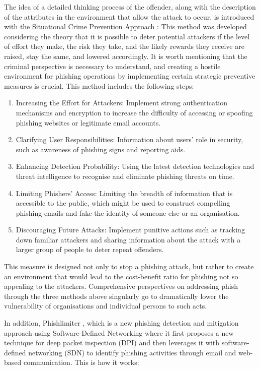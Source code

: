 The idea of a detailed thinking process of the offender, along with the description of the attributes in the environment that allow the attack to occur, is introduced with the Situational Crime Prevention Approach \cite{Suzuki2021Phishing}: This method was developed considering the theory that it is possible to deter potential attackers if the level of effort they make, the risk they take, and the likely rewards they receive are raised, stay the same, and lowered accordingly. It is worth mentioning that the criminal perspective is necessary to understand, and creating a hostile environment for phishing operations by implementing certain strategic preventive measures is crucial. This method includes the following steps:

 

\begin{enumerate}
    \item Increasing the Effort for Attackers: Implement strong authentication mechanisms and encryption to increase the difficulty of accessing or spoofing phishing websites or legitimate email accounts.
    \item Clarifying User Responsibilities: Information about users' role in security, such as awareness of phishing signs and reporting aids.
    \item Enhancing Detection Probability: Using the latest detection technologies and threat intelligence to recognise and eliminate phishing threats on time.
    \item Limiting Phishers' Access: Limiting the breadth of information that is accessible to the public, which might be used to construct compelling phishing emails and fake the identity of someone else or an organisation.
    \item Discouraging Future Attacks: Implement punitive actions such as tracking down familiar attackers and sharing information about the attack with a larger group of people to deter repeat offenders.
\end{enumerate}

This measure is designed not only to stop a phishing attack, but rather to create an environment that would lead to the cost-benefit ratio for phishing not so appealing to the attackers. Comprehensive perspectives on addressing phish through the three methods above singularly go to dramatically lower the vulnerability of organisations and individual persons to such acts.

In addition, Phishlimiter \cite{Chin2018PhishLimiter} , which is a new phishing detection and mitigation approach using Software-Defined Networking where it first proposes a new technique for deep packet inspection (DPI) and then leverages it with software-defined networking (SDN) to identify phishing activities through email and web-based communication. This is how it works:

